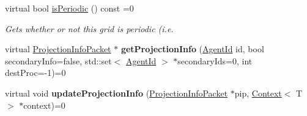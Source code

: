 \begin{DoxyCompactItemize}
virtual bool \hyperlink{classrepast_1_1_grid_a81e7eb612dabbf2fb4b3f1190cd92f88}{is\-Periodic} () const =0
\begin{DoxyCompactList}\small\item\em Gets whether or not this grid is periodic (i.\-e. \end{DoxyCompactList}\item 
\hypertarget{classrepast_1_1_grid_a768c6b3b623a0b06e96321738af2da41}{virtual \hyperlink{classrepast_1_1_projection_info_packet}{Projection\-Info\-Packet} $\ast$ {\bfseries get\-Projection\-Info} (\hyperlink{classrepast_1_1_agent_id}{Agent\-Id} id, bool secondary\-Info=false, std\-::set$<$ \hyperlink{classrepast_1_1_agent_id}{Agent\-Id} $>$ $\ast$secondary\-Ids=0, int dest\-Proc=-\/1)=0}\label{classrepast_1_1_grid_a768c6b3b623a0b06e96321738af2da41}

\item 
\hypertarget{classrepast_1_1_grid_a69f9208e8224c3a63a41c935906ffe6b}{virtual void {\bfseries update\-Projection\-Info} (\hyperlink{classrepast_1_1_projection_info_packet}{Projection\-Info\-Packet} $\ast$pip, \hyperlink{classrepast_1_1_context}{Context}$<$ T $>$ $\ast$context)=0}\label{classrepast_1_1_grid_a69f9208e8224c3a63a41c935906ffe6b}


\end{DoxyCompactItemize}

